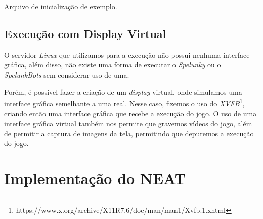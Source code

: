 \begin{algorithm}[H]

\caption[Arquivo de inicialização de exemplo.]
{\label{alg:ini-file}Arquivo de inicialização de exemplo.}
\end{algorithm}

\subsection{\label{sub:virtual-display}Execução com Display Virtual}

O servidor \textit{Linux} que utilizamos para a execução não possui nenhuma
interface gráfica, além disso, não existe uma forma de executar o
\textit{Spelunky} ou o \textit{SpelunkBots} sem considerar uso de uma.

Porém, é possível fazer a criação de um \textit{display} virtual, onde
simulamos uma interface gráfica semelhante a uma real. Nesse caso, fizemos o
uso do
\textit{XVFB}\footnote{https://www.x.org/archive/X11R7.6/doc/man/man1/Xvfb.1.xhtml},
criando então uma interface gráfica que recebe a execução do jogo. O uso de uma
interface gráfica virtual também nos permite que gravemos vídeos do jogo, além
de permitir a captura de imagens da tela, permitindo que depuremos a execução
do jogo.

\section{\label{section:neat-details}Implementação do NEAT}


